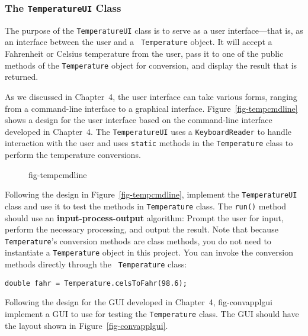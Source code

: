 

\subsubsection*{The {\tt TemperatureUI} Class}
\noindent The purpose of the {\tt TemperatureUI} class is to serve as a 
user interface---that is, as an interface between the user and a {\tt
Temperature} object.  It will accept a Fahrenheit or Celsius
temperature from the user, pass it to one of the public methods of the
{\tt Temperature} object for conversion, and display the result that
is returned. 

As we discussed in Chapter~4, the user interface can take various
forms, ranging from a command-line interface to a graphical
interface. Figure~\ref{fig-tempcmdline} shows a design for the user
interface based on the command-line interface developed in
Chapter~4. The {\tt TemperatureUI} uses a {\tt KeyboardReader} to
handle interaction with the user and uses {\tt static} methods in the
{\tt Temperature} class to perform the temperature conversions.

\begin{figure}[h!]
{fig-tempcmdline}
\end{figure}


\begin{SSTUDY}
\item  Following the design in Figure~\ref{fig-tempcmdline},
implement the {\tt TemperatureUI} class and use it to test the methods
in {\tt Temperature} class. The {\tt run()} method should use an {\bf
input-process-output} algorithm: Prompt the user for input, perform
the necessary processing, and output the result. Note that because
{\tt Temperature}'s conversion methods are class methods, you do not
need to instantiate a {\tt Temperature} object in this project. You
can invoke the conversion methods directly through the {\tt
Temperature} class:

\begin{jjjlisting}
\begin{lstlisting}
double fahr = Temperature.celsToFahr(98.6);
\end{lstlisting}
\end{jjjlisting}

\item  Following the design for the GUI developed in Chapter~4,
{fig-convapplgui}
implement a GUI to use for testing the {\tt Temperature} class.
The GUI should have the layout shown in Figure~\ref{fig-convapplgui}.
\end{SSTUDY}

